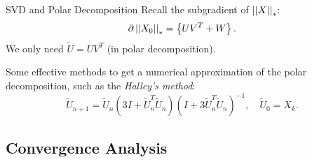 \documentclass{beamer}
\begin{document}
\begin{frame}{SVD and Polar Decomposition}
    Recall the subgradient of \(\left|\left|X\right|\right|_\ast\):
    \[\partial\left|\left|X_0\right|\right|_\ast=\left\{UV^T+W\right\}.\]
    We only need \(\tilde U=UV^T\) (in polar decomposition).
    \pause\par
    Some effective methods to get a numerical approximation of the polar decomposition, such as the \textit{Halley's method}:
    \[\tilde U_{n+1}=\tilde U_n\left(3I+\tilde U_n^T\tilde U_n\right)\left(I+3\tilde U_n^T\tilde U_n\right)^{-1},\quad \tilde U_0=X_k.\]
\end{frame}

\subsection{Convergence Analysis}
\end{document}
